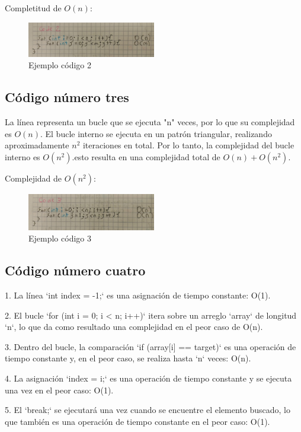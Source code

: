 \documentclass[journal, spanish]{IEEEtran}
\begin{document}
Completitud de $O(n)$:
\begin{figure}[H]
  \centering
  \includegraphics[width=0.5\textwidth]{WhatsApp Image 2023-09-11 at 7.55.14 PM.jpeg}
  \caption{Ejemplo código 2}
  \label{fig:imagen2}
\end{figure}

\subsection{Código número tres}
La línea representa un bucle que se ejecuta "n" veces, por lo que su complejidad es $O(n)$.
El bucle interno se ejecuta en un patrón triangular, realizando aproximadamente $n^2$ iteraciones en total.
Por lo tanto, la complejidad del bucle interno es $O(n^2)$.esto resulta en una complejidad total de $O(n) + O(n^2)$.

Complejidad de $O(n^2)$:
\begin{figure}[H]
  \centering
  \includegraphics[width=0.5\textwidth]{WhatsApp Image 2023-09-11 at 7.57.25 PM.jpeg}
  \caption{Ejemplo código 3}
  \label{fig:imagen3}
\end{figure}


\subsection{Código número cuatro}

1. La línea `int index = -1;` es una asignación de tiempo constante: O(1).

2. El bucle `for (int i = 0; i < n; i++)` itera sobre un arreglo `array` de longitud `n`, lo que da como resultado una complejidad en el peor caso de O(n).

3. Dentro del bucle, la comparación `if (array[i] == target)` es una operación de tiempo constante y, en el peor caso, se realiza hasta `n` veces: O(n).

4. La asignación `index = i;` es una operación de tiempo constante y se ejecuta una vez en el peor caso: O(1).

5. El `break;` se ejecutará una vez cuando se encuentre el elemento buscado, lo que también es una operación de tiempo constante en el peor caso: O(1).\\
\end{document}
